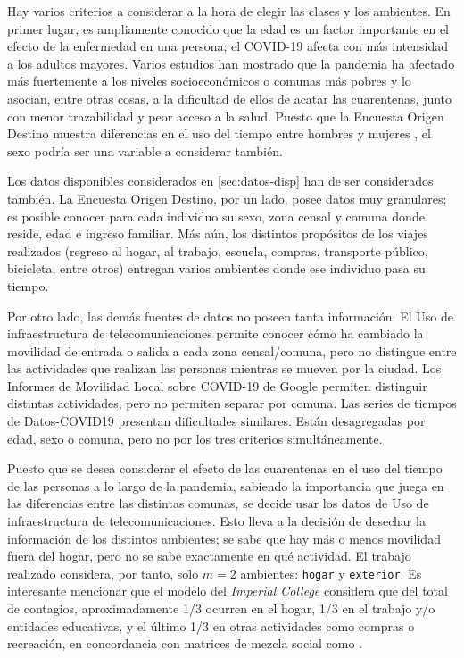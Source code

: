 Hay varios criterios a considerar a la hora de elegir las clases y los ambientes. En primer lugar, es ampliamente conocido \cite{Davies2020}\cite{Verity2020} que la edad es un factor importante en el efecto de la enfermedad en una persona; el COVID-19 afecta con más intensidad a los adultos mayores. Varios estudios \cite{Wang2020}\cite{Ahmed2020}\cite{Chang2021}\cite{Mena2021}\cite{Bennett2021} han mostrado que la pandemia ha afectado más fuertemente a los niveles socioeconómicos o comunas más pobres y lo asocian, entre otras cosas, a la dificultad de ellos de acatar las cuarentenas, junto con menor trazabilidad y peor acceso a la salud. Puesto que la Encuesta Origen Destino muestra diferencias en el uso del tiempo entre hombres y mujeres \cite{Jara-Diaz2013}, el sexo podría ser una variable a considerar también.

Los datos disponibles considerados en \ref{sec:datos-disp} han de ser considerados también. La Encuesta Origen Destino, por un lado, posee datos muy granulares; es posible conocer para cada individuo su sexo, zona censal y comuna donde reside, edad e ingreso familiar. Más aún, los distintos propósitos de los viajes realizados (regreso al hogar, al trabajo, escuela, compras, transporte público, bicicleta, entre otros) entregan varios ambientes donde ese individuo pasa su tiempo. 

Por otro lado, las demás fuentes de datos no poseen tanta información. El Uso de infraestructura de telecomunicaciones permite conocer cómo ha cambiado la movilidad de entrada o salida a cada zona censal/comuna, pero no distingue entre las actividades que realizan las personas mientras se mueven por la ciudad. Los Informes de Movilidad Local sobre COVID-19 de Google permiten distinguir distintas actividades, pero no permiten separar por comuna. Las series de tiempos de Datos-COVID19 presentan dificultades similares. Están desagregadas por edad, sexo o comuna, pero no por los tres criterios simultáneamente.

Puesto que se desea considerar el efecto de las cuarentenas en el uso del tiempo de las personas a lo largo de la pandemia, sabiendo la importancia que juega en las diferencias entre las distintas comunas, se decide usar los datos de Uso de infraestructura de telecomunicaciones. Esto lleva a la decisión de desechar la información de los distintos ambientes; se sabe que hay más o menos movilidad fuera del hogar, pero no se sabe exactamente en qué actividad. El trabajo realizado considera, por tanto, solo \(m = 2\) ambientes: \texttt{hogar} y \texttt{exterior}. Es interesante mencionar que el modelo del \textit{Imperial College} \cite{Ferguson2020} considera que del total de contagios, aproximadamente 1/3 ocurren en el hogar, 1/3 en el trabajo y/o entidades educativas, y el último 1/3 en otras actividades como compras o recreación, en concordancia con matrices de mezcla social como \cite{Mossong2008}.

